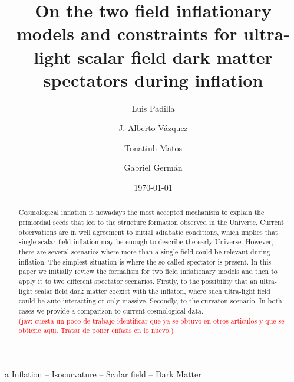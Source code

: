\documentclass[amssymb,twocolumn,prd,nofootinbib,showpacs]{revtex4-1}
\newcommand{\jav}[1]{\textcolor{red}{(jav: #1)}}
\begin{document}
\title{On the two field inflationary models and constraints for ultra-light scalar field dark matter spectators during inflation}
\author{Luis Padilla}  
   \author{J. Alberto V\'azquez}  
\author{Tonatiuh Matos}  
   \author{Gabriel Germ\'an}  

\date{\today}

\begin{abstract}
Cosmological inflation is nowadays the most accepted mechanism to explain the  primordial seeds 
that led to  the structure formation observed in the Universe. Current observations are in well agreement 
to initial adiabatic conditions, which implies that  single-scalar-field inflation may be enough to describe 
the early Universe. 
%
However, there are several scenarios where more than a single field could be relevant during inflation. 
The simplest situation is where the so-called spectator is present. 
In this paper we initially review the formalism for two field inflationary models and then to apply it to two different 
spectator scenarios. Firstly, to the possibility that an ultra-light scalar field dark matter coexist with the inflaton, 
where such ultra-light field could be auto-interacting or only massive. Secondly, to the curvaton scenario.
In both cases we provide a comparison to current cosmological data.    
\\
\jav{cuesta un poco de trabajo identificar que ya se obtuvo en otros articulos y que se obtiene aqui. Tratar de poner enfasis
en lo nuevo.}
\end{abstract}
\begin{keywords}
a Inflation  --  Isocurvature  --  Scalar field -- Dark Matter
\end{keywords}

\maketitle
\end{document}
